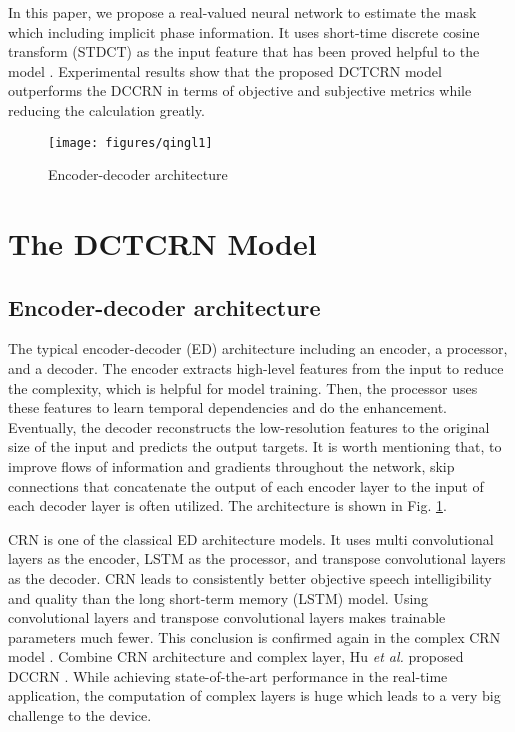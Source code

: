 \documentclass[journal,10pt]{IEEEtran}
\begin{document}
In this paper, we propose a real-valued neural network to estimate the mask which including implicit phase information. It uses short-time discrete cosine transform (STDCT) as the input feature that has been proved helpful to the model \cite{ahmed1974discrete, dct-dl}. Experimental results show that the proposed DCTCRN model outperforms the DCCRN in terms of objective and subjective metrics while reducing the calculation greatly.

\begin{figure}[t]
\centering\texttt{[image: figures/qingl1]}
\caption{Encoder-decoder architecture}
\label{fig:structure}
\end{figure}


\section{The DCTCRN Model}
\label{sec:dctcrn}
\subsection{Encoder-decoder architecture}

The typical encoder-decoder (ED) architecture including an encoder, a processor, and a decoder. The encoder extracts high-level features from the input to reduce the complexity, which is helpful for model training. Then, the processor uses these features to learn temporal dependencies and do the enhancement. Eventually, the decoder reconstructs the low-resolution features to the original size of the input and predicts the output targets. It is worth mentioning that, to improve flows of information and gradients throughout the network, skip connections that concatenate the output of each encoder layer to the input of each decoder layer is often utilized. The architecture is shown in Fig. \ref{fig:structure}.


CRN is one of the classical ED architecture models\cite{tan2018convolutional}. It uses multi convolutional layers as the encoder, LSTM as the processor, and transpose convolutional layers as the decoder. CRN leads to consistently better objective speech intelligibility and quality than the long short-term memory (LSTM) model. Using convolutional layers and transpose convolutional layers makes trainable parameters much fewer. This conclusion is confirmed again in the complex CRN model \cite{tan2019complex}. Combine CRN architecture and complex layer, Hu \textit{et al.} proposed DCCRN \cite{hu2020dccrn}. While achieving state-of-the-art performance in the real-time application,  the computation of complex layers is huge which leads to a very big challenge to the device.
\end{document}
